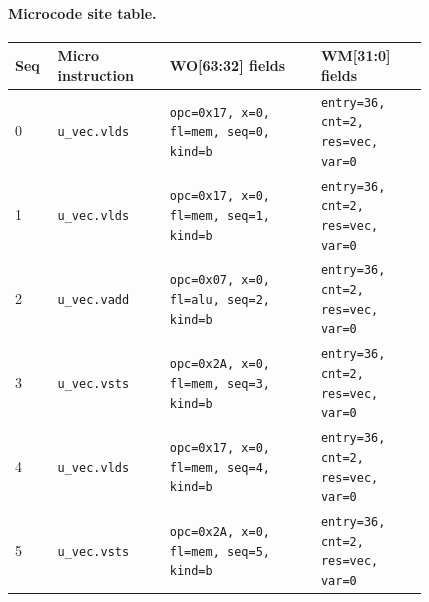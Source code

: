 \paragraph{Microcode site table.}
{\scriptsize
\begin{longtable}{@{}R{0.055\linewidth}L{0.23\linewidth}L{0.31\linewidth}L{0.22\linewidth}@{}}
\toprule
Seq & Micro instruction & WO[63:32] fields & WM[31:0] fields \\
 & \texttt{u\_vec.vlds} & \texttt{opc=0x17, x=0, fl=mem, seq=0, kind=b} & \texttt{entry=36, cnt=2, res=vec, var=0} \\
1 & \texttt{u\_vec.vlds} & \texttt{opc=0x17, x=0, fl=mem, seq=1, kind=b} & \texttt{entry=36, cnt=2, res=vec, var=0} \\
2 & \texttt{u\_vec.vadd} & \texttt{opc=0x07, x=0, fl=alu, seq=2, kind=b} & \texttt{entry=36, cnt=2, res=vec, var=0} \\
3 & \texttt{u\_vec.vsts} & \texttt{opc=0x2A, x=0, fl=mem, seq=3, kind=b} & \texttt{entry=36, cnt=2, res=vec, var=0} \\
4 & \texttt{u\_vec.vlds} & \texttt{opc=0x17, x=0, fl=mem, seq=4, kind=b} & \texttt{entry=36, cnt=2, res=vec, var=0} \\
5 & \texttt{u\_vec.vsts} & \texttt{opc=0x2A, x=0, fl=mem, seq=5, kind=b} & \texttt{entry=36, cnt=2, res=vec, var=0} \\
\bottomrule
\end{longtable}
}
